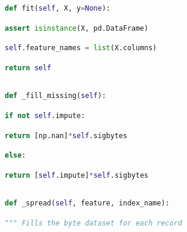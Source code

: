 \documentclass[
  11pt,
  a4paper,
  DIV=12,captions=tableheading,oneside]{scrbook}
\begin{document}
\begin{lstlisting}[language=Python,stepnumber=2,basicstyle=\footnotesize]
\end{lstlisting}
\begin{lstlisting}[language=Python,stepnumber=2,basicstyle=\footnotesize]
    def fit(self, X, y=None):\end{lstlisting}
\begin{lstlisting}[language=Python,stepnumber=2,basicstyle=\footnotesize]
        assert isinstance(X, pd.DataFrame)\end{lstlisting}
\begin{lstlisting}[language=Python,stepnumber=2,basicstyle=\footnotesize]
        self.feature_names = list(X.columns)\end{lstlisting}
\begin{lstlisting}[language=Python,stepnumber=2,basicstyle=\footnotesize]
        return self\end{lstlisting}
\begin{lstlisting}[language=Python,stepnumber=2,basicstyle=\footnotesize]
\end{lstlisting}
\begin{lstlisting}[language=Python,stepnumber=2,basicstyle=\footnotesize]
    def _fill_missing(self):\end{lstlisting}
\begin{lstlisting}[language=Python,stepnumber=2,basicstyle=\footnotesize]
        if not self.impute:\end{lstlisting}
\begin{lstlisting}[language=Python,stepnumber=2,basicstyle=\footnotesize]
            return [np.nan]*self.sigbytes\end{lstlisting}
\begin{lstlisting}[language=Python,stepnumber=2,basicstyle=\footnotesize]
        else:\end{lstlisting}
\begin{lstlisting}[language=Python,stepnumber=2,basicstyle=\footnotesize]
            return [self.impute]*self.sigbytes\end{lstlisting}
\begin{lstlisting}[language=Python,stepnumber=2,basicstyle=\footnotesize]
\end{lstlisting}
\begin{lstlisting}[language=Python,stepnumber=2,basicstyle=\footnotesize]
    def _spread(self, feature, index_name):\end{lstlisting}
\begin{lstlisting}[language=Python,stepnumber=2,basicstyle=\footnotesize]
        """ Fills the byte dataset for each record\end{lstlisting}
\end{document}
